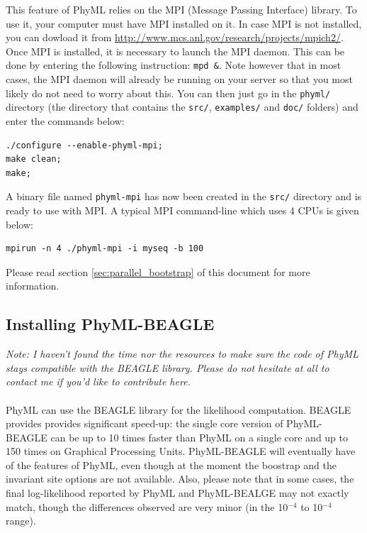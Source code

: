 \documentclass[a4paper,12pt]{article}
\newcommand{\x}[1]{\texttt{#1}}
\begin{document}
This  feature of  PhyML relies  on the  MPI (Message  Passing Interface)  library. To  use  it, your
computer must  have MPI  installed on  it. In case  MPI is  not installed, you  can dowload  it from
\href{http://www.mcs.anl.gov/research/projects/mpich2/}{http://www.mcs.anl.gov/research/projects/mpich2/}.
Once MPI is  installed, it is necessary to launch  the MPI daemon. This can be  done by entering the
following instruction: \x{mpd \&}.  Note however that in most cases, the  MPI daemon will already be
running on your server so  that you most likely do not need to worry  about this. You can then just
go in the \x{phyml/} directory (the directory that contains the \x{src/}, \x{examples/} and \x{doc/}
folders) and enter the commands below:

{\setlength{\baselineskip}{0.5\baselineskip}
\begin{verbatim}
./configure --enable-phyml-mpi;
make clean;
make;
\end{verbatim}
}

A binary file named \x{phyml-mpi} has now been created in the \x{src/} directory and is ready to use
with MPI. A typical MPI command-line which uses 4 CPUs is given below:

{\setlength{\baselineskip}{0.5\baselineskip}
\begin{verbatim}
mpirun -n 4 ./phyml-mpi -i myseq -b 100
\end{verbatim}
}

\noindent Please read section \ref{sec:parallel_bootstrap} of this document for more information.

\subsection{Installing PhyML-BEAGLE}\label{sec:install-phyml-beagle}

{\em Note: I haven't found the time nor the resources to make sure the code of PhyML stays
  compatible with the BEAGLE library. Please do not hesitate at all to contact me if you'd
  like to contribute here.}
\\
\\
PhyML  can use  the  BEAGLE\cite{ayres12}  library for  the  likelihood computation.  BEAGLE
provides provides  significant speed-up: the  single core  version of PhyML-BEAGLE  can be up  to 10
times  faster  than  PhyML  on  a  single   core  and  up  to  150  times  on  Graphical  Processing
Units. PhyML-BEAGLE  will eventually have of  the features of PhyML,  even though at  the moment the
boostrap and the invariant site options are not available. Also, please note that in some cases, the
final  log-likelihood  reported  by  PhyML  and  PhyML-BEALGE may  not  exactly  match,  though  the
differences observed are very minor (in the 10$^{-4}$ to 10$^{-4}$ range).
\end{document}
